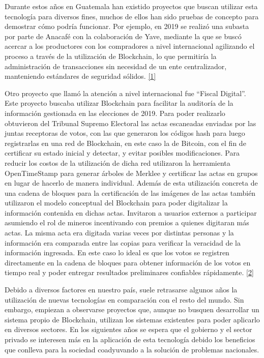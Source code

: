 \documentclass[12pt,spanish,Letterpaper,openany]{book}
\begin{document}
\hypertarget{articulo01_cross01}{}

Durante estos años en Guatemala han existido proyectos que buscan utilizar esta tecnología para diversos fines, muchos de ellos han sido pruebas de concepto para demostrar cómo podría funcionar. Por ejemplo, en 2019 se realizó una subasta por parte de Anacafé con la colaboración de Yave, mediante la que se buscó acercar a los productores con los compradores a nivel internacional agilizando el proceso a través de la utilización de Blockchain, lo que permitiría la administración de transacciones sin necesidad de un ente centralizador, manteniendo estándares de seguridad sólidos. \protect\hyperlink{articulo01_ref01}{{[}1{]}}

\hypertarget{articulo01_cross02}{}

Otro proyecto que llamó la atención a nivel internacional fue ``Fiscal Digital''. Este proyecto buscaba utilizar Blockchain para facilitar la auditoría de la información gestionada en las elecciones de 2019. Para poder realizarlo obtuvieron del Tribunal Supremo Electoral las actas escaneadas enviadas por las juntas receptoras de votos, con las que generaron los códigos hash para luego registrarlas en una red de Blockchain, en este caso la de Bitcoin, con el fin de certificar su estado inicial y detectar, y evitar posibles modificaciones. Para reducir los costos de la utilización de dicha red utilizaron la herramienta OpenTimeStamp para generar árboles de Merklee y certificar las actas en grupos en lugar de hacerlo de manera individual. Además de esta utilización concreta de una cadena de bloques para la certificación de las imágenes de las actas también utilizaron el modelo conceptual del Blockchain para poder digitalizar la información contenida en dichas actas. Invitaron a usuarios externos a participar asumiendo el rol de mineros incentivando con premios a quienes digitaran más actas. La misma acta era digitada varias veces por distintas personas y la información era comparada entre las copias para verificar la veracidad de la información ingresada. En este caso lo ideal es que los votos se registren directamente en la cadena de bloques para obtener información de los votos en tiempo real y poder entregar resultados preliminares confiables rápidamente. \protect\hyperlink{articulo01_ref02}{{[}2{]}}

Debido a diversos factores en nuestro país, suele retrasarse algunos años la utilización de nuevas tecnologías en comparación con el resto del mundo. Sin embargo, empiezan a observarse proyectos que, aunque no busquen desarrollar un sistema propio de Blockchain, utilizan los sistemas existentes para poder aplicarlo en diversos sectores. En los siguientes años se espera que el gobierno y el sector privado se interesen más en la aplicación de esta tecnología debido los beneficios que conlleva para la sociedad coadyuvando a la solución de problemas nacionales.
\end{document}

